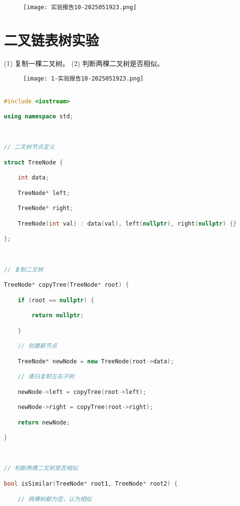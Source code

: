 \begin{figure}[H]
\centering
\texttt{[image: 实验报告10-2025051923.png]}
\label{}
\end{figure}

\section{二叉链表树实验}

(1) 复制一棵二叉树。
(2) 判断两棵二叉树是否相似。

\begin{figure}[H]
\centering
\texttt{[image: 1-实验报告10-2025051923.png]}
\label{}
\end{figure}

\begin{lstlisting}[language=C++]

#include <iostream>

using namespace std;

  

// 二叉树节点定义

struct TreeNode {

    int data;

    TreeNode* left;

    TreeNode* right;

    TreeNode(int val) : data(val), left(nullptr), right(nullptr) {}

};

  

// 复制二叉树

TreeNode* copyTree(TreeNode* root) {

    if (root == nullptr) {

        return nullptr;

    }

    // 创建新节点

    TreeNode* newNode = new TreeNode(root->data);

    // 递归复制左右子树

    newNode->left = copyTree(root->left);

    newNode->right = copyTree(root->right);

    return newNode;

}

  

// 判断两棵二叉树是否相似

bool isSimilar(TreeNode* root1, TreeNode* root2) {

    // 两棵树都为空，认为相似


\end{lstlisting}
